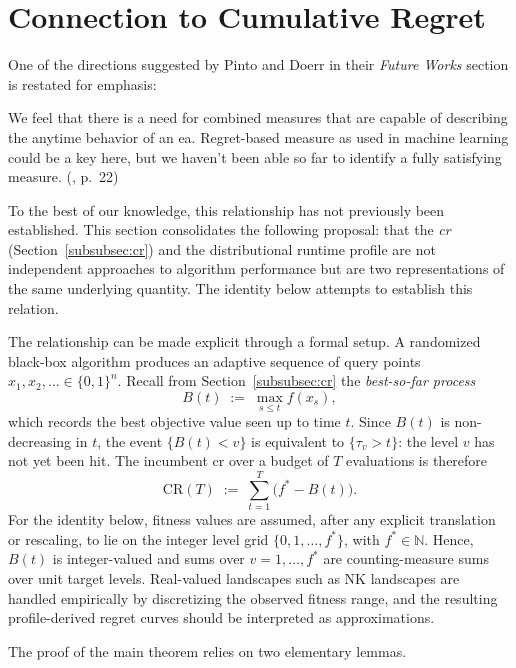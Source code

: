 \section{Connection to Cumulative Regret}
\label{subsec:regret-profiles}

One of the directions suggested by Pinto and Doerr in their
\textit{Future Works}
section is restated for emphasis:
\begin{displayquote}
  We feel that there is a need for combined measures that are capable
  of describing
  the anytime behavior of an \acrshort{ea}. Regret-based measure as
  used in machine learning could be a key here, but we haven't been
  able so far to
  identify a fully satisfying measure.
  {(\cite{pinto2018practice}, p.~22)}
\end{displayquote}
To the best of our knowledge, this relationship has not previously been established.
This section consolidates the following proposal: that the \textit{\acrfull{cr}}
(Section~\ref{subsubsec:cr}) and the distributional runtime profile
are not independent
approaches to algorithm performance but are two representations of
the same underlying
quantity. The identity below attempts to establish this relation.

The relationship can be made explicit through a formal setup. A
randomized black-box
algorithm produces an adaptive sequence of query points $x_1, x_2, \ldots \in
\{0,1\}^n$. Recall from Section~\ref{subsubsec:cr} the
\textit{best-so-far process}
\[
  B(t) \;:=\; \max_{s \leq t} f(x_s),
\]
which records the best objective value seen up to time $t$. Since $B(t)$ is
non-decreasing in $t$, the event $\{B(t) < v\}$ is equivalent to
$\{\tau_v > t\}$:
the level $v$ has not yet been hit. The incumbent \acrshort{cr}
over a budget of
$T$ evaluations is therefore
\[
  \mathrm{CR}(T) \;:=\; \sum_{t=1}^{T} \bigl(f^* - B(t)\bigr).
\]
For the identity below, fitness values are assumed, after any
explicit translation or rescaling, to lie on the integer level grid
\(\{0,1,\ldots,f^*\}\), with \(f^* \in \mathbb{N}\). Hence, \(B(t)\) is
integer-valued and sums over \(v=1,\ldots,f^*\) are counting-measure sums
over unit target levels. Real-valued landscapes such as NK landscapes are handled
empirically by discretizing the observed fitness range, and the resulting
profile-derived regret curves should be interpreted as approximations.

The proof of the main theorem relies on two elementary lemmas.


